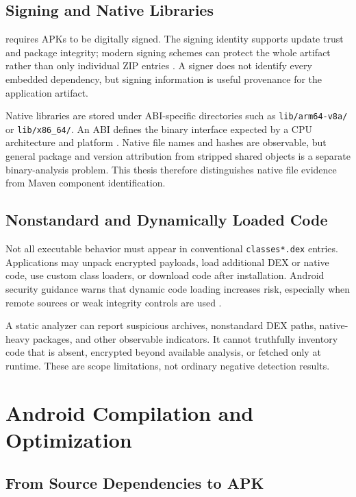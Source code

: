 \subsection{Signing and Native Libraries}

\Android requires APKs to be digitally signed. The signing identity supports
update trust and package integrity; modern signing schemes can protect the
whole artifact rather than only individual ZIP entries
\cite{androidSigning}. A signer does not identify every embedded dependency,
but signing information is useful provenance for the application artifact.

Native libraries are stored under ABI-specific directories such as
\texttt{lib/arm64-v8a/} or \texttt{lib/x86\_64/}. An ABI defines the binary
interface expected by a CPU architecture and platform
\cite{androidAbi}. Native file names and hashes are observable, but general
package and version attribution from stripped shared objects is a separate
binary-analysis problem. This thesis therefore distinguishes native file
evidence from Maven component identification.

\subsection{Nonstandard and Dynamically Loaded Code}

Not all executable behavior must appear in conventional
\texttt{classes*.dex} entries. Applications may unpack encrypted payloads,
load additional DEX or native code, use custom class loaders, or download code
after installation. Android security guidance warns that dynamic code loading
increases risk, especially when remote sources or weak integrity controls are
used \cite{androidDynamicCode}.

A static \APK analyzer can report suspicious archives, nonstandard DEX paths,
native-heavy packages, and other observable indicators. It cannot truthfully
inventory code that is absent, encrypted beyond available analysis, or fetched
only at runtime. These are scope limitations, not ordinary negative detection
results.

\section{Android Compilation and Optimization}

\subsection{From Source Dependencies to APK}

